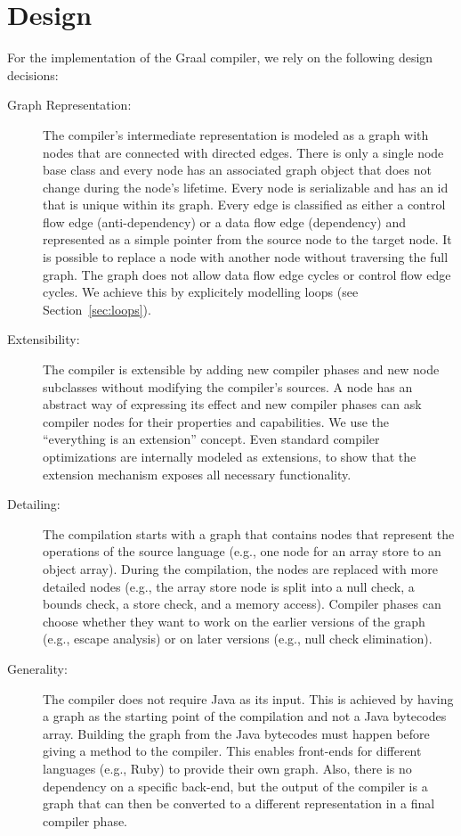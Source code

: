 \documentclass[twocolumn]{svjour3}
\begin{document}
\section{Design}
For the implementation of the Graal compiler, we rely on the following design decisions:
\begin{description}
\item[Graph Representation:]
The compiler's intermediate representation is modeled as a graph with nodes that are connected with directed edges.
There is only a single node base class and every node has an associated graph object that does not change during the node's lifetime.
Every node is serializable and has an id that is unique within its graph.
Every edge is classified as either a control flow edge (anti-dependency) or a data flow edge (dependency) and represented as a simple pointer from the source node to the target node.
It is possible to replace a node with another node without traversing the full graph.
The graph does not allow data flow edge cycles or control flow edge cycles.
We achieve this by explicitely modelling loops (see Section~\ref{sec:loops}). 
\item[Extensibility:]
The compiler is extensible by adding new compiler phases and new node subclasses without modifying the compiler's sources.
A node has an abstract way of expressing its effect and new compiler phases can ask compiler nodes for their properties and capabilities.
We use the ``everything is an extension'' concept.
Even standard compiler optimizations are internally modeled as extensions, to show that the extension mechanism exposes all necessary functionality.
\item[Detailing:]
The compilation starts with a graph that contains nodes that represent the operations of the source language (e.g., one node for an array store to an object array).
During the compilation, the nodes are replaced with more detailed nodes (e.g., the array store node is split into a null check, a bounds check, a store check, and a memory access).
Compiler phases can choose whether they want to work on the earlier versions of the graph (e.g., escape analysis) or on later versions (e.g., null check elimination).
\item[Generality:]
The compiler does not require Java as its input.
This is achieved by having a graph as the starting point of the compilation and not a Java bytecodes array.
Building the graph from the Java bytecodes must happen before giving a method to the compiler.
This enables front-ends for different languages (e.g., Ruby) to provide their own graph.
Also, there is no dependency on a specific back-end, but the output of the compiler is a graph that can then be converted to a different representation in a final compiler phase.
\end{description}
\end{document}
